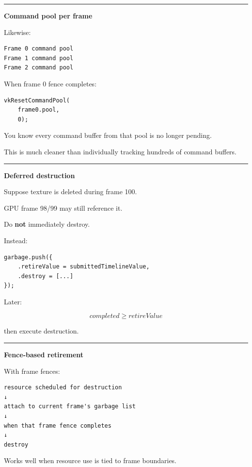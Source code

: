 \begin{center}\rule{0.5\linewidth}{0.5pt}\end{center}

\textbf{Command pool per frame}

Likewise:

\begin{verbatim}
Frame 0 command pool
Frame 1 command pool
Frame 2 command pool
\end{verbatim}

When frame 0 fence completes:

\begin{verbatim}
vkResetCommandPool(
    frame0.pool,
    0);
\end{verbatim}

You know every command buffer from that pool is no longer pending.

This is much cleaner than individually tracking hundreds of command buffers.

\begin{center}\rule{0.5\linewidth}{0.5pt}\end{center}

\textbf{Deferred destruction}

Suppose texture is deleted during frame 100.

GPU frame 98/99 may still reference it.

Do \textbf{not} immediately destroy.

Instead:

\begin{verbatim}
garbage.push({
    .retireValue = submittedTimelineValue,
    .destroy = [...]
});
\end{verbatim}

Later:

\[
completed\ge retireValue
\]

then execute destruction.

\begin{center}\rule{0.5\linewidth}{0.5pt}\end{center}

\textbf{Fence-based retirement}

With frame fences:

\begin{verbatim}
resource scheduled for destruction
↓
attach to current frame's garbage list
↓
when that frame fence completes
↓
destroy
\end{verbatim}

Works well when resource use is tied to frame boundaries.

